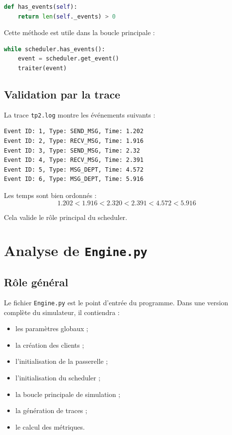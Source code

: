 \documentclass{article}
\begin{document}
\begin{lstlisting}[language=Python, caption=Principe de has_events]
def has_events(self):
    return len(self._events) > 0
\end{lstlisting}

Cette méthode est utile dans la boucle principale :

\begin{lstlisting}[language=Python, caption=Boucle principale conceptuelle]
while scheduler.has_events():
    event = scheduler.get_event()
    traiter(event)
\end{lstlisting}

\subsection{Validation par la trace}

La trace \texttt{tp2.log} montre les événements suivants :

\begin{verbatim}
Event ID: 1, Type: SEND_MSG, Time: 1.202
Event ID: 2, Type: RECV_MSG, Time: 1.916
Event ID: 3, Type: SEND_MSG, Time: 2.32
Event ID: 4, Type: RECV_MSG, Time: 2.391
Event ID: 5, Type: MSG_DEPT, Time: 4.572
Event ID: 6, Type: MSG_DEPT, Time: 5.916
\end{verbatim}

Les temps sont bien ordonnés :
\[
1.202 < 1.916 < 2.320 < 2.391 < 4.572 < 5.916
\]

Cela valide le rôle principal du scheduler.

\section{Analyse de \texttt{Engine.py}}

\subsection{Rôle général}

Le fichier \texttt{Engine.py} est le point d’entrée du programme. Dans une version complète du simulateur, il contiendra :
\begin{itemize}[leftmargin=*]
    \item les paramètres globaux ;
    \item la création des clients ;
    \item l’initialisation de la passerelle ;
    \item l’initialisation du scheduler ;
    \item la boucle principale de simulation ;
    \item la génération de traces ;
    \item le calcul des métriques.
\end{itemize}
\end{document}
